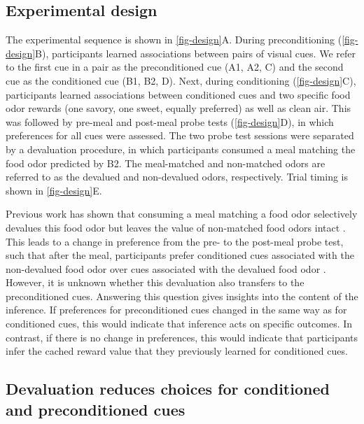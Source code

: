 \documentclass[9pt,twocolumn,twoside]{pnas-new}
\begin{document}
\subsection*{Experimental design}
\label{subsec-design}



The experimental sequence is shown in \autoref{fig-design}A. During preconditioning (\autoref{fig-design}B), participants learned associations between pairs of visual cues. We refer to the first cue in a pair as the preconditioned cue (A1, A2, C) and the second cue as the conditioned cue (B1, B2, D). Next, during conditioning (\autoref{fig-design}C), participants learned associations between conditioned cues and two specific food odor rewards (one savory, one sweet, equally preferred) as well as clean air. This was followed by pre-meal and post-meal probe tests (\autoref{fig-design}D), in which preferences for all cues were assessed. The two probe test sessions were separated by a devaluation procedure, in which participants consumed a meal matching the food odor predicted by B2. The meal-matched and non-matched odors are referred to as the devalued and non-devalued odors, respectively. Trial timing is shown in \autoref{fig-design}E.

Previous work has shown that consuming a meal matching a food odor selectively devalues this food odor but leaves the value of non-matched food odors intact \cite{howard2017identity,HowRey2020,liu2025distinct}. This leads to a change in preference from the pre- to the post-meal probe test, such that after the meal, participants prefer conditioned cues associated with the non-devalued food odor over cues associated with the devalued food odor \cite{HowRey2020,liu2025distinct}. However, it is unknown whether this devaluation also transfers to the preconditioned cues. Answering this question gives insights into the content of the inference. If preferences for preconditioned cues changed in the same way as for conditioned cues, this would indicate that inference acts on specific outcomes. In contrast, if there is no change in preferences, this would indicate that participants infer the cached reward value that they previously learned for conditioned cues.




\subsection*{Devaluation reduces choices for conditioned and preconditioned cues}
\label{subsec-beh}
\end{document}
